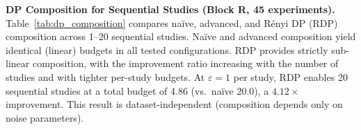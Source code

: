 \documentclass[conference,a4paper]{IEEEtran}
\begin{document}
\begin{table}[htbp]
\centering
\caption{Concept drift robustness on Cardiovascular (Block~Q, 36 experiments, 2 seeds). Drop: accuracy decrease from pre-drift. Recovery: accuracy gain from adaptation.}
\label{tab:concept_drift}
\end{table}

\smallskip\noindent\textbf{DP Composition for Sequential Studies (Block R, 45 experiments).}
Table~\ref{tab:dp_composition} compares na\"ive, advanced, and R\'enyi DP (RDP) composition across 1--20 sequential studies. Na\"ive and advanced composition yield identical (linear) budgets in all tested configurations. RDP provides strictly sub-linear composition, with the improvement ratio increasing with the number of studies and with tighter per-study budgets. At $\varepsilon{=}1$ per study, RDP enables 20 sequential studies at a total budget of 4.86 (vs.\ na\"ive 20.0), a $4.12\times$ improvement. This result is dataset-independent (composition depends only on noise parameters).
\end{document}
